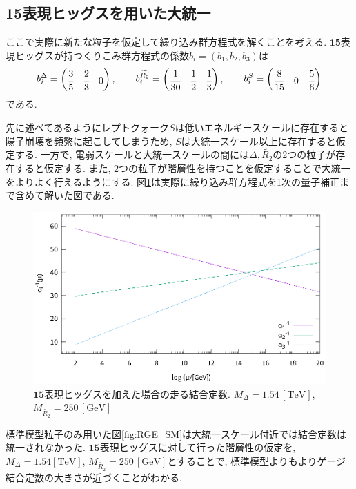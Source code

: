 \subsection{15表現ヒッグスを用いた大統一}
ここで実際に新たな粒子を仮定して繰り込み群方程式を解くことを考える.
$\bm{15}$表現ヒッグスが持つくりこみ群方程式の係数$b_i=(b_1, b_2, b_3)$は
\begin{align}
  b_i^\Delta=\begin{pmatrix}
    \cfrac{3}{5} & \cfrac{2}{3} & 0
  \end{pmatrix},\qquad
  b_i^{\widetilde{R_2}}=\begin{pmatrix}
    \cfrac{1}{30} & \cfrac{1}{2} & \cfrac{1}{3}
  \end{pmatrix},\qquad
  b_i^{S}=\begin{pmatrix}
    \cfrac{8}{15} & 0 & \cfrac{5}{6}
  \end{pmatrix}
\end{align}
である.

先に述べてあるようにレプトクォーク$S$は低いエネルギースケールに存在すると陽子崩壊を頻繁に起こしてしまうため, $S$は大統一スケール以上に存在すると仮定する.
一方で, 電弱スケールと大統一スケールの間には$\Delta, \widetilde{R_2}$の2つの粒子が存在すると仮定する.
また, 2つの粒子が階層性を持つことを仮定することで大統一をよりよく行えるようにする.
図\ref{fig:RGE_15_1loop}は実際に繰り込み群方程式を1次の量子補正まで含めて解いた図である.
\begin{figure}[ht]
  \centering
  \includegraphics[width=12truecm,clip]{fig/RGE_15_1loop.eps}
  \caption{$\bm{15}$表現ヒッグスを加えた場合の走る結合定数. $M_\Delta=1.54\,[\mathrm{TeV}]$, $M_{\widetilde{R_2}}=250\,[\mathrm{GeV}]$ }
  \label{fig:RGE_15_1loop}
\end{figure}

標準模型粒子のみ用いた図\ref{fig:RGE_SM}は大統一スケール付近では結合定数は統一されなかった.
$\bm{15}$表現ヒッグスに対して行った階層性の仮定を, $M_\Delta = 1.54[\mathrm{TeV}]$, $M_{\widetilde{R_2}} =250\,[\mathrm{GeV}]$とすることで, 標準模型よりもよりゲージ結合定数の大きさが近づくことがわかる.

